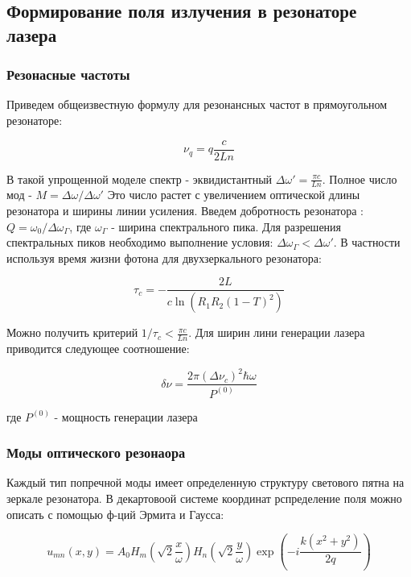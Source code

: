 \documentclass[a4paper]{article}
\begin{document}
\subsection{Формирование поля излучения в резонаторе лазера}

\subsubsection{Резонасные частоты}

Приведем общеизвестную формулу для резонансных частот в прямоугольном резонаторе:

\begin{equation}
	\nu_q = q \frac{c}{2Ln}
\end{equation}

В такой упрощенной моделе спектр - эквидистантный $\Delta \omega ' = \frac{\pi c}{Ln}$. Полное число мод - $M = \Delta \omega / \Delta \omega'$ Это число растет с увеличением оптической длины резонатора и ширины линии усиления. Введем добротность резонатора : $Q = \omega_0 / \Delta \omega_\Gamma$, где $\omega_\Gamma$ - ширина спектрального пика. Для разрешения спектральных пиков необходимо выполнение условия: $\Delta \omega_\Gamma < \Delta \omega '$. В частности используя время жизни фотона для двухзеркального резонатора:

\begin{equation}
	\tau_c = - \frac{2L}{c \ln(R_1 R_2 (1-T)^2)}
\end{equation}

Можно получить критерий $1/\tau_c <  \frac{\pi c}{Ln}$. Для ширин лини генерации лазера приводится следующее соотношение:

\begin{equation}
	\delta \nu = \frac{2 \pi (\Delta \nu_c)^2 \hbar \omega}{P^{(0)}}
\end{equation}

где $P^{(0)}$ - мощность генерации лазера

\subsubsection{Моды оптического резонаора}

Каждый тип попречной моды имеет определенную структуру светового пятна на зеркале резонатора. В декартовоой системе координат рспределение поля можно описать с помощью ф-ций Эрмита и Гаусса:

\begin{equation}
	u_{mn}(x, y) = A_0 H_m(\sqrt{2}\frac{x}{\omega}) H_n(\sqrt{2}\frac{y}{\omega}) \exp{(-i \frac{k(x^2+y^2)}{2q})}
\end{equation}
\end{document}
